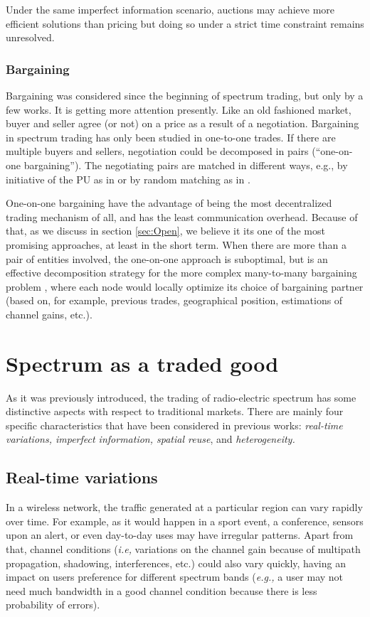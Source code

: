 Under the same imperfect information scenario, auctions may achieve more efficient solutions than pricing but doing so under a strict time constraint remains unresolved. 

\subsubsection{Bargaining}

Bargaining was considered since the beginning of spectrum trading, but only by a few works. It is getting more attention presently. Like an old fashioned market, buyer and seller agree (or not) on a price as a result of a negotiation. Bargaining in spectrum trading has only been studied in one-to-one trades. If there are multiple buyers and sellers, negotiation could be decomposed in pairs (``one-on-one bargaining''). The negotiating pairs are matched in different ways, e.g., by initiative of the PU as in \cite{ref:Simeone2008} or by random matching as in \cite{ref:Xu2012}.

One-on-one bargaining have the advantage of being the most decentralized trading mechanism of all, and has the least communication overhead. Because of that, as we discuss in section \ref{sec:Open}, we believe it its one of the most promising approaches, at least in the short term. When there are more than a pair of entities involved, the one-on-one approach is suboptimal, but is an effective decomposition strategy for the more complex many-to-many bargaining problem \cite{ref:Yan2012}, where each node would locally optimize its choice of bargaining partner (based on, for example, previous trades, geographical position, estimations of channel gains, etc.). 		

\section{Spectrum as a traded good}
\label{sec:TradedGood}
As it was previously introduced, the trading of radio-electric spectrum has some distinctive aspects with respect to traditional markets. There are mainly four specific characteristics that have been considered in previous works: \textit{real-time variations, imperfect information, spatial reuse}, and \textit{heterogeneity.}

\subsection{Real-time variations}
\label{subsec:Real}
In a wireless network, the traffic generated at a particular region can vary rapidly over time. For example, as it would happen in a sport event, a conference, sensors upon an alert, or even day-to-day uses may have irregular patterns. Apart from that, channel conditions (\textit{i.e,} variations on the channel gain because of multipath propagation, shadowing, interferences, etc.) could also vary quickly, having an impact on users preference for different spectrum bands (\textit{e.g.,} a user may not need much bandwidth in a good channel condition because there is less probability of errors). 

